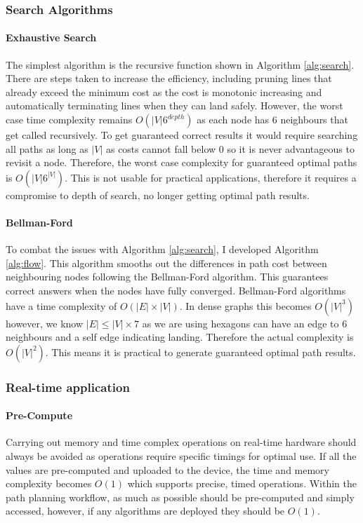 \subsubsection{Search Algorithms}\label{sub_sub_section:tgt_search}


\paragraph{Exhaustive Search}
The simplest algorithm is the recursive function shown in Algorithm \ref{alg:search}. There are steps taken to increase the efficiency, including pruning lines that already exceed the minimum cost as the cost is monotonic increasing and automatically terminating lines when they can land safely. However, the worst case time complexity remains $O(|V|6^{depth})$ as each node has 6 neighbours that get called recursively. To get guaranteed correct results it would require searching all paths as long as $|V|$ as costs cannot fall below 0 so it is never advantageous to revisit a node. Therefore, the worst case complexity for guaranteed optimal paths is $O(|V|6^{|V|})$. This is not usable for practical applications, therefore it requires a compromise to depth of search, no longer getting optimal path results.
\paragraph{Bellman-Ford}
To combat the issues with Algorithm \ref{alg:search}, I developed Algorithm \ref{alg:flow}. This algorithm smooths out the differences in path cost between neighbouring nodes following the Bellman-Ford algorithm. This guarantees correct answers when the nodes have fully converged. Bellman-Ford algorithms have a time complexity of $O(|E|\times |V|)$. In dense graphs this becomes  $O(|V|^3)$ however, we know $|E| \leq |V| \times 7$ as we are using hexagons can have an edge to 6 neighbours and a self edge indicating landing. Therefore the actual complexity is $O(|V|^2)$\cite{cormen2009}. This means it is practical to generate guaranteed optimal path results.

\subsubsection{Real-time application}\label{sub_sub_section:tgt_real_time}
\paragraph{Pre-Compute}
Carrying out memory and time complex operations on real-time hardware should always be avoided as operations require specific timings for optimal use. If all the values are pre-computed and uploaded to the device, the time and memory complexity becomes $O(1)$ which supports precise, timed operations. Within the path planning workflow, as much as possible should be pre-computed and simply accessed, however, if any algorithms are deployed they should be $O(1)$.
